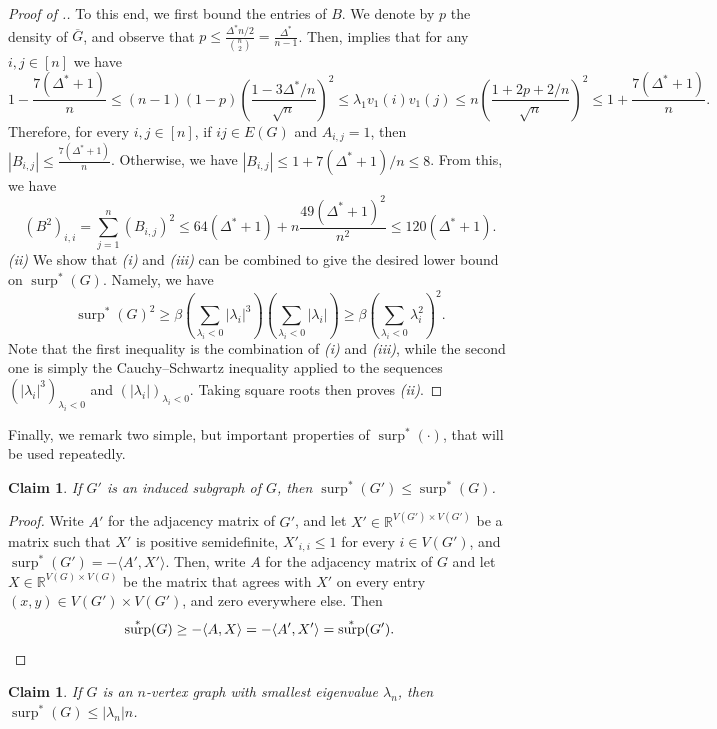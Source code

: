 \documentclass[11pt]{article}
\theoremstyle{plain}
\newtheorem{claim}[theorem]{Claim}
\theoremstyle{definition}
\DeclareMathOperator{\surp}{surp}
\begin{document}
\begin{proof}[Proof of .]
To this end, we first bound the entries of $B$. We denote by $p$ the density of $\overline{G}$, and observe that $p\leq \frac{\Delta^* n/2}{\binom{n}{2}}= \frac{\Delta^*}{n-1}$. 
Then,  implies that for any $i, j\in [n]$ we have 
\[ 1-\frac{7(\Delta^* + 1)}{n}
    \leq (n-1)(1-p)\left(\frac{1-3\Delta^*/n}{\sqrt{n}}\right)^2
    \leq \lambda_1 v_1(i)v_1(j)\leq n\left(\frac{1+2p+2/n}{\sqrt{n}}\right)^2
    \leq 1+\frac{7(\Delta^*+1)}{n}.\]
Therefore, for every $i, j\in [n]$, if $ij\in E(G)$ and $A_{i, j}=1$, then $|B_{i, j}|\leq \frac{7(\Delta^*+1)}{n}$. 
Otherwise, we have $|B_{i,j}|\leq 1+7(\Delta^*+1)/n\leq 8$. 
From this, we have 
$$(B^2)_{i,i}=\sum_{j=1}^n (B_{i,j})^2\leq 64(\Delta^*+1)+n\frac{49(\Delta^*+1)^2}{n^2}\leq 120(\Delta^*+1).$$
\textit{(ii)} We show that \textit{(i)} and \textit{(iii)} can be combined to give the desired lower bound on $\surp^*(G)$. Namely, we have
\[\surp^*(G)^2\geq \beta\left(\sum_{\lambda_i<0}|\lambda_i|^3\right)\left(\sum_{\lambda_i<0}|\lambda_i|\right)\geq \beta\left(\sum_{\lambda_i<0}\lambda_i^2\right)^2.\]
Note that the first inequality is the combination of \textit{(i)} and \textit{(iii)}, while the second one is simply the Cauchy--Schwartz inequality applied to the sequences $(|\lambda_i|^3)_{\lambda_i<0}$ and $(|\lambda_i|)_{\lambda_i<0}$. Taking square roots then proves \textit{(ii)}.
\end{proof}

Finally, we remark two simple, but important properties of $\surp^*(\cdot)$, that will be used repeatedly.

\begin{claim}
If $G'$ is an induced subgraph of $G$, then $\surp^*(G')\leq \surp^*(G)$.
\end{claim}

\begin{proof}
    Write $A'$ for the adjacency matrix of $G'$, and let $X'\in \mathbb{R}^{V(G')\times V(G')}$ be a matrix such that $X'$ is positive semidefinite, $X'_{i,i}\leq 1$ for every $i\in V(G')$, and $\surp^*(G')=-\langle A',X'\rangle$. 
    Then, write $A$ for the adjacency matrix of $G$ and let $X\in \mathbb{R}^{V(G)\times V(G)}$ be the matrix that agrees with $X'$ on every entry $(x,y)\in V(G')\times V(G')$, and zero everywhere else. Then \[\surp^*(G)\geq -\langle A,X\rangle=-\langle A',X'\rangle=\surp^*(G').\hfill\qedhere\]
\end{proof}

\begin{claim}\label{claim: surp* lambdan}
If $G$ is an $n$-vertex graph with smallest eigenvalue $\lambda_n$, then $\surp^*(G)\leq |\lambda_n|n$.
\end{claim}
\end{document}
